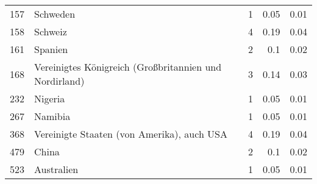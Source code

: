 \begin{longtable}{lXrrr}
        157 & \multicolumn{1}{X}{Schweden} & %
          \num{1} &
          \num[round-mode=places,round-precision=2]{0,05} &
          \num[round-mode=places,round-precision=2]{0,01} \\

        158 & \multicolumn{1}{X}{Schweiz} & %
          \num{4} &
          \num[round-mode=places,round-precision=2]{0,19} &
          \num[round-mode=places,round-precision=2]{0,04} \\

        161 & \multicolumn{1}{X}{Spanien} & %
          \num{2} &
          \num[round-mode=places,round-precision=2]{0,1} &
          \num[round-mode=places,round-precision=2]{0,02} \\

        168 & \multicolumn{1}{X}{Vereinigtes Königreich (Großbritannien und Nordirland)} & %
          \num{3} &
          \num[round-mode=places,round-precision=2]{0,14} &
          \num[round-mode=places,round-precision=2]{0,03} \\

        232 & \multicolumn{1}{X}{Nigeria} & %
          \num{1} &
          \num[round-mode=places,round-precision=2]{0,05} &
          \num[round-mode=places,round-precision=2]{0,01} \\

        267 & \multicolumn{1}{X}{Namibia} & %
          \num{1} &
          \num[round-mode=places,round-precision=2]{0,05} &
          \num[round-mode=places,round-precision=2]{0,01} \\

        368 & \multicolumn{1}{X}{Vereinigte Staaten (von Amerika), auch USA} & %
          \num{4} &
          \num[round-mode=places,round-precision=2]{0,19} &
          \num[round-mode=places,round-precision=2]{0,04} \\

        479 & \multicolumn{1}{X}{China} & %
          \num{2} &
          \num[round-mode=places,round-precision=2]{0,1} &
          \num[round-mode=places,round-precision=2]{0,02} \\

        523 & \multicolumn{1}{X}{Australien} & %
          \num{1} &
          \num[round-mode=places,round-precision=2]{0,05} &
          \num[round-mode=places,round-precision=2]{0,01} \\


\end{longtable}
